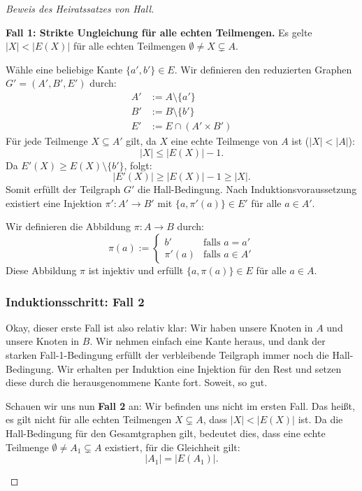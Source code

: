 \begin{proof}[Beweis des Heiratssatzes von Hall]
\begin{math-stroke}
\begin{short-proof}
\textbf{Fall 1: Strikte Ungleichung für alle echten Teilmengen.}
Es gelte $|X| < |E(X)|$ für alle echten Teilmengen $\emptyset \neq X \subsetneq A$.
\par\vspace{1ex}\noindent
Wähle eine beliebige Kante $\{a', b'\} \in E$. Wir definieren den reduzierten Graphen $G' = (A', B', E')$ durch:
\begin{align*}
A' &:= A \setminus \{a'\} \\
B' &:= B \setminus \{b'\} \\
E' &:= E \cap (A' \times B')
\end{align*}
Für jede Teilmenge $X \subseteq A'$ gilt, da $X$ eine echte Teilmenge von $A$ ist ($|X| < |A|$):
\[
|X| \le |E(X)| - 1.
\]
Da $E'(X) \ge E(X) \setminus \{b'\}$, folgt:
\[
|E'(X)| \ge |E(X)| - 1 \ge |X|.
\]
Somit erfüllt der Teilgraph $G'$ die Hall-Bedingung. Nach Induktionsvoraussetzung existiert eine Injektion $\pi' \colon A' \to B'$ mit $\{a, \pi'(a)\} \in E'$ für alle $a \in A'$.
\par\vspace{1ex}\noindent
Wir definieren die Abbildung $\pi \colon A \to B$ durch:
\[
\pi(a) := \begin{cases}
b' & \text{falls } a = a' \\
\pi'(a) & \text{falls } a \in A'
\end{cases}
\]
Diese Abbildung $\pi$ ist injektiv und erfüllt $\{a, \pi(a)\} \in E$ für alle $a \in A$.
\end{short-proof}
\end{math-stroke}

\subsubsection{Induktionsschritt: Fall 2}

\begin{spoken-clean}[01:10:52 - 01:12:42]
Okay, dieser erste Fall ist also relativ klar: Wir haben unsere Knoten in $A$ und unsere Knoten in $B$. Wir nehmen einfach eine Kante heraus, und dank der starken Fall-1-Bedingung erfüllt der verbleibende Teilgraph immer noch die Hall-Bedingung. Wir erhalten per Induktion eine Injektion für den Rest und setzen diese durch die herausgenommene Kante fort. Soweit, so gut.

Schauen wir uns nun \textbf{Fall 2} an: Wir befinden uns nicht im ersten Fall. Das heißt, es gilt nicht für alle echten Teilmengen $X \subsetneq A$, dass $|X| < |E(X)|$ ist. Da die Hall-Bedingung für den Gesamtgraphen gilt, bedeutet dies, dass eine echte Teilmenge $\emptyset \neq A_1 \subsetneq A$ existiert, für die Gleichheit gilt:
\[
|A_1| = |E(A_1)|.
\]
\end{spoken-clean}


\end{proof}
